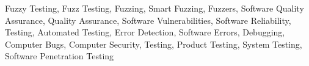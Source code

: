 \documentclass[10pt, final, journal, letterpaper, twoside, twocolumn]{IEEEtran}
\begin{document}
\begin{abstract}
\end{abstract}

\begin{IEEEkeywords}
	Fuzzy Testing, Fuzz Testing, Fuzzing, Smart Fuzzing, Fuzzers, Software Quality Assurance, Quality Assurance, Software Vulnerabilities, Software Reliability, Testing, Automated Testing, Error Detection, Software Errors, Debugging, Computer Bugs, Computer Security, Testing, Product Testing, System Testing, Software Penetration Testing
\end{IEEEkeywords}
\end{document}
